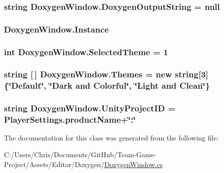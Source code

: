 \subsubsection[{\texorpdfstring{Doxygen\+Output\+String}{DoxygenOutputString}}]{\setlength{\rightskip}{0pt plus 5cm}string Doxygen\+Window.\+Doxygen\+Output\+String = null}\hypertarget{class_doxygen_window_a20e7d1bdb1f32c97f600bf0f0bdb2358}{}\label{class_doxygen_window_a20e7d1bdb1f32c97f600bf0f0bdb2358}
\subsubsection[{\texorpdfstring{Instance}{Instance}}]{ Doxygen\+Window.\+Instance\hspace{0.3cm}{\ttfamily [static]}}\hypertarget{class_doxygen_window_a45d09c9a64d2873367470303789e3bf9}{}\label{class_doxygen_window_a45d09c9a64d2873367470303789e3bf9}
\subsubsection[{\texorpdfstring{Selected\+Theme}{SelectedTheme}}]{\setlength{\rightskip}{0pt plus 5cm}int Doxygen\+Window.\+Selected\+Theme = 1}\hypertarget{class_doxygen_window_aff9bfc8c7ed3f017a61e67025ea7c99a}{}\label{class_doxygen_window_aff9bfc8c7ed3f017a61e67025ea7c99a}
\subsubsection[{\texorpdfstring{Themes}{Themes}}]{\setlength{\rightskip}{0pt plus 5cm}string \mbox{[}$\,$\mbox{]} Doxygen\+Window.\+Themes = new string\mbox{[}3\mbox{]} \{\char`\"{}Default\char`\"{}, \char`\"{}Dark and Colorful\char`\"{}, \char`\"{}Light and Clean\char`\"{}\}}\hypertarget{class_doxygen_window_a2dfb0ba26737a0e996797c2848cc2fc0}{}\label{class_doxygen_window_a2dfb0ba26737a0e996797c2848cc2fc0}
\subsubsection[{\texorpdfstring{Unity\+Project\+ID}{UnityProjectID}}]{\setlength{\rightskip}{0pt plus 5cm}string Doxygen\+Window.\+Unity\+Project\+ID = Player\+Settings.\+product\+Name+\char`\"{}\+:\char`\"{}}\hypertarget{class_doxygen_window_a0c52f34973444c41e90151536dbd6e82}{}\label{class_doxygen_window_a0c52f34973444c41e90151536dbd6e82}


The documentation for this class was generated from the following file\+:\begin{DoxyCompactItemize}
\item 
C\+:/\+Users/\+Chris/\+Documents/\+Git\+Hub/\+Team-\/\+Game-\/\+Project/\+Assets/\+Editor/\+Doxygen/\hyperlink{_doxygen_window_8cs}{Doxygen\+Window.\+cs}\end{DoxyCompactItemize}
